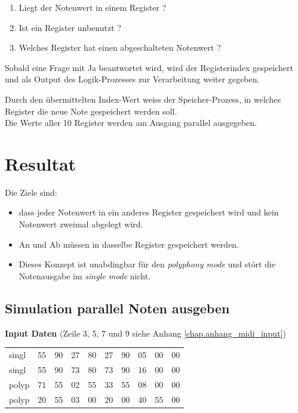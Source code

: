 \begin{enumerate}
	\item Liegt der Notenwert in einem Register ? 
	\item Ist ein Register unbenutzt ?
	\item Welches Register hat einen abgeschalteten Notenwert ?
\end{enumerate}

Sobald eine Frage mit Ja beantwortet wird, wird der Registerindex gespeichert und als Output des Logik-Prozesses zur Verarbeitung weiter gegeben.

Durch den übermittelten Index-Wert weiss der Speicher-Prozess, in welches Register die neue Note gespeichert werden soll.\\
Die Werte aller 10 Register werden am Ausgang parallel ausgegeben.

\section{Resultat}\label{test_polypohne}

Die Ziele sind:

\begin{itemize}
    \item dass jeder Notenwert in ein anderes Register gespeichert wird und kein Notenwert zweimal abgelegt wird.
    \item An und Ab müssen in dasselbe Register gespeichert werden.
    \item Dieses Konzept ist unabdingbar für den \textit{polyphony mode} und stört die Notenausgabe im \textit{single mode} nicht. 
\end{itemize}


\subsection{Simulation parallel Noten ausgeben}

\textbf{Input Daten} (Zeile 3, 5, 7 und 9 siehe Anhang \ref{chap.anhang_midi_input})

{
\renewcommand{\arraystretch}{1.0}
\begin{tabular*}{\textwidth}{@{}@{\extracolsep{\fill}}*{10}{l}@{}}
singl & 55 & 90 & 27 & 80 & 27 & 90 & 05 & 00 & 00\\
singl & 55 & 90 & 73 & 80 & 73 & 90 & 16 & 00 & 00\\
polyp & 71 & 55 & 02 & 55 & 33 & 55 & 08 & 00 & 00\\
polyp & 20 & 55 & 03 & 00 & 20 & 00 & 40 & 55 & 00
\end{tabular*}
}

